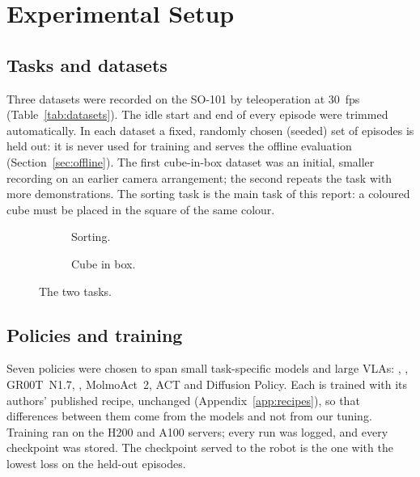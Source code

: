\chapter{Experimental Setup}\label{ch:setup}

\section{Tasks and datasets}

Three datasets were recorded on the SO-101 by teleoperation at 30~fps (Table~\ref{tab:datasets}). The idle start and
end of every episode were trimmed automatically. In each dataset a fixed, randomly chosen (seeded) set of episodes is
held out: it is never used for training and serves the offline evaluation (Section~\ref{sec:offline}). The first
cube-in-box dataset was an initial, smaller recording on an earlier camera arrangement; the second repeats the task
with more demonstrations. The sorting task is the main task of this report: a coloured cube must be placed in the
square of the same colour.

\begin{table}[htbp]
  \centering
  \caption{Datasets. Joint units: degrees, or LeRobot's normalised range for the earlier recordings.}
  \label{tab:datasets}
  \small
\end{table}

\begin{figure}[htbp]
  \centering
  \begin{subfigure}[t]{0.48\textwidth}
    \centering
    \caption{Sorting.}
  \end{subfigure}\hfill
  \begin{subfigure}[t]{0.48\textwidth}
    \centering
    \caption{Cube in box.}
  \end{subfigure}
  \caption{The two tasks.}
  \label{fig:tasks}
\end{figure}

\section{Policies and training}\label{sec:policies}

Seven policies were chosen to span small task-specific models and large VLAs: \smolvla, \groot, GR00T~N1.7,
\pizerofive, MolmoAct~2, ACT and Diffusion Policy. Each is trained with its authors' published recipe, unchanged
(Appendix~\ref{app:recipes}), so that differences between them come from the models and not from our tuning. Training
ran on the H200 and A100 servers; every run was logged, and every checkpoint was stored. The checkpoint served to the
robot is the one with the lowest loss on the held-out episodes.

